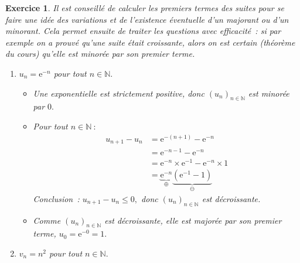 \documentclass[10pt]{article}
\newtheorem{exo}{Exercice}
\begin{document}
\begin{exo}

Il est conseillé de calculer les premiers termes des suites pour se faire une idée des variations et de l'existence éventuelle d'un majorant ou d'un minorant. Cela permet ensuite de traiter les questions avec efficacité~: si par exemple on a prouvé qu'une suite était croissante, alors on est certain (théorème du cours) qu'elle est minorée par son premier terme.

\medskip 


\begin{enumerate}
\item $u_n=\text{e}^{-n}$ pour tout $n\in\mathbb{N}.$

\begin{itemize}
\item[\textbullet] Une exponentielle est strictement positive, donc $\left(u_n\right)_{n\in\mathbb{N}}$ est minorée par $0.$
\item[\textbullet] Pour tout $n\in\mathbb{N}~:$
\begin{align*}u_{n+1}-u_{n}&=\text{e}^{-(n+1)}-\text{e}^{-n}
\\&=\text{e}^{-n-1}-\text{e}^{-n}
\\&=\text{e}^{-n}\times\text{e}^{-1} -\text{e}^{-n}\times 1
\\&=\underbrace{\text{e}^{-n}}_{\oplus}\underbrace{\left(\text{e}^{-1}-1\right)}_{\ominus}
\end{align*}
Conclusion~: $u_{n+1}-u_{n}\leq 0,$ donc $\left(u_n\right)_{n\in\mathbb{N}}$ est décroissante.
\item[\textbullet] Comme $\left(u_n\right)_{n\in\mathbb{N}}$ est décroissante, elle est majorée par son premier terme, $u_0=\text{e}^{-0}=1.$
\end{itemize}
\item $v_n=n^2$ pour tout $n\in\mathbb{N}.$



\end{enumerate}
\end{exo}
\end{document}
